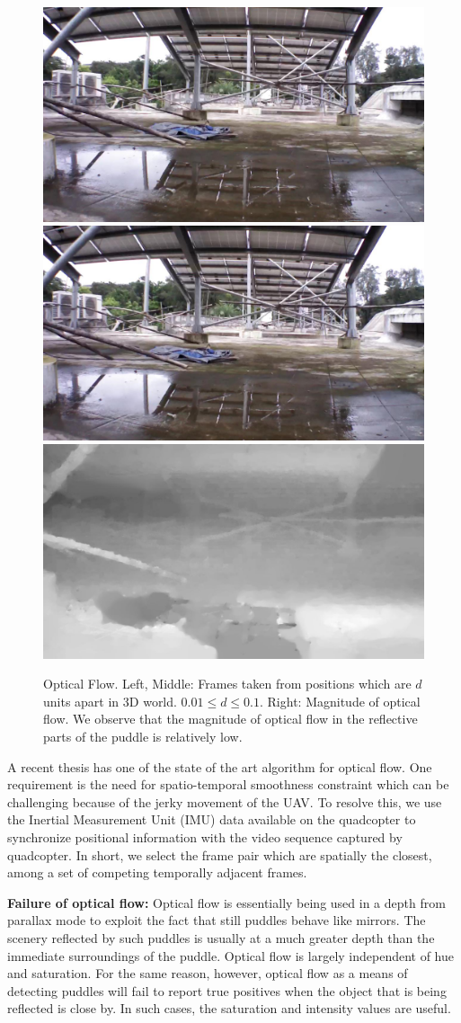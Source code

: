 \documentclass[11pt]{article}
\begin{document}
\begin{figure}[h!]
  \centering
  \includegraphics[width=0.32\linewidth]{stagnantWater/figures/IMG_PAIR_27_1}
  \hfill
  \includegraphics[width=0.32\linewidth]{stagnantWater/figures/IMG_PAIR_27_2}
  \hfill
  \includegraphics[width=0.32\linewidth]{stagnantWater/figures/IMG_PAIR_27_optical_flow}
  \caption{Optical Flow. Left, Middle: Frames taken from positions
    which are $d$ units apart in 3D world. $ 0.01 \leq d \leq 0.1$. Right:
    Magnitude of optical flow. We observe that the magnitude of optical
    flow in the reflective parts of the puddle is relatively low.}
  \label{fig:optical_flow}
\end{figure}

A recent thesis \cite{Liu11Thesis} has one of the state of the art
algorithm for optical flow. One requirement is the need for
spatio-temporal smoothness constraint which can be challenging because
of the jerky movement of the UAV.  To resolve this, we use the
Inertial Measurement Unit (IMU) data available on the quadcopter to
synchronize positional information with the video sequence captured by
quadcopter. In short, we select the frame pair which are spatially the
closest, among a set of competing temporally adjacent frames.

\textbf{Failure of optical flow:} Optical flow is essentially being
used in a depth from parallax mode to exploit the fact that still
puddles behave like mirrors. The scenery reflected by such puddles is
usually at a much greater depth than the immediate surroundings of the
puddle.  Optical flow is largely independent of hue and saturation.
For the same reason, however, optical flow as a means of detecting
puddles will fail to report true positives when the object that is
being reflected is close by. In such cases, the saturation and
intensity values are useful.
\end{document}
